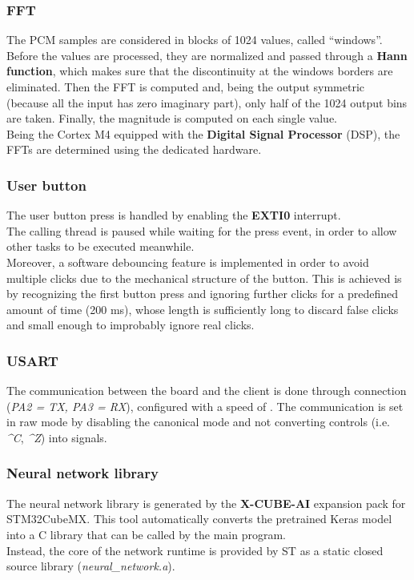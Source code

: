 \documentclass[12pt]{article}
\begin{document}
\subsubsection{FFT}
The PCM samples are considered in blocks of 1024 values, called ``windows''. Before the values are processed, they are normalized and passed through a \textbf{Hann function}, which makes sure that the discontinuity at the windows borders are eliminated. Then the FFT is computed and, being the output symmetric (because all the input has zero imaginary part), only half of the 1024 output bins are taken. Finally, the magnitude is computed on each single value.\\
Being the Cortex M4 equipped with the \textbf{Digital Signal Processor} (DSP), the FFTs are determined using the dedicated hardware.

\subsubsection{User button}
The user button press is handled by enabling the \textbf{EXTI0} interrupt.\\
The calling thread is paused while waiting for the press event, in order to allow other tasks to be executed meanwhile.\\
Moreover, a software debouncing feature is implemented in order to avoid multiple clicks due to the mechanical structure of the button. This is achieved is by recognizing the first button press and ignoring further clicks for a predefined amount of time (200 ms), whose length is sufficiently long to discard false clicks and small enough to improbably ignore real clicks.

\subsubsection{USART}
The communication between the board and the client is done through  connection (\textit{PA2 = TX, PA3 = RX}), configured with a speed of . The communication is set in raw mode by disabling the canonical mode and not converting controls (i.e. \textit{\^{}C}, \textit{\^{}Z}) into signals.

\subsubsection{Neural network library}
The neural network library is generated by the \textbf{X-CUBE-AI} expansion pack for STM32CubeMX. This tool automatically converts the pretrained Keras model into a C library that can be called by the main program.\\
Instead, the core of the network runtime is provided by ST as a static closed source library (\textit{neural\_network.a}).
\end{document}
